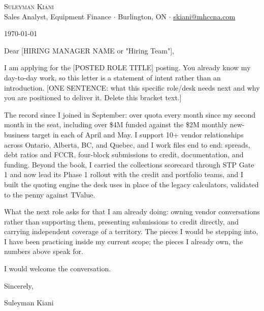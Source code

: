 \documentclass[letterpaper,11pt]{article}
\newcommand{\role}{[POSTED ROLE TITLE]}
\newcommand{\hiringmgr}{[HIRING MANAGER NAME or "Hiring Team"]}
\newcommand{\hook}{[ONE SENTENCE: what this specific role/desk needs next and why you are positioned to deliver it. Delete this bracket text.]}
\begin{document}
\begin{center}
    {\Huge \scshape Suleyman Kiani} \\ \vspace{3pt}
    \small Sales Analyst, Equipment Finance $\cdot$ Burlington, ON $\cdot$ \href{mailto:skiani@mhccna.com}{\underline{skiani@mhccna.com}}
\end{center}

\vspace{8pt}
\today

Dear \hiringmgr,

I am applying for the \role{} posting. You already know my day-to-day work, so this letter is a statement of intent rather than an introduction. \hook{}

The record since I joined in September: over quota every month since my second month in the seat, including over \$4M funded against the \$2M monthly new-business target in each of April and May. I support 10+ vendor relationships across Ontario, Alberta, BC, and Quebec, and I work files end to end: spreads, debt ratios and FCCR, four-block submissions to credit, documentation, and funding. Beyond the book, I carried the collections scorecard through STP Gate 1 and now lead its Phase 1 rollout with the credit and portfolio teams, and I built the quoting engine the desk uses in place of the legacy calculators, validated to the penny against TValue.

What the next role asks for that I am already doing: owning vendor conversations rather than supporting them, presenting submissions to credit directly, and carrying independent coverage of a territory. The pieces I would be stepping into, I have been practicing inside my current scope; the pieces I already own, the numbers above speak for.

I would welcome the conversation. %

Sincerely,

Suleyman Kiani
\end{document}
